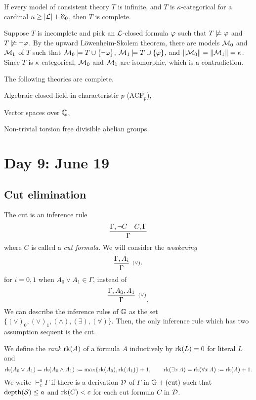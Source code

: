 \documentclass{../../../small}
\begin{document}
\begin{thm*}
If every model of consistent theory $T$ is infinite, and $T$ is $\kappa$-categorical for a cardinal $\kappa\ge|\mathcal{L}|+\aleph_0$, then $T$ is complete.
\end{thm*}
\begin{pf}
Suppose $T$ is incomplete and pick an $\mathcal{L}$-closed formula $\varphi$ such that $T\not\models\varphi$ and $T\not\models\neg\varphi$.
By the upward L\"owenheim-Skolem theorem, there are models $\mathcal{M}_0$ and $\mathcal{M}_1$ of $T$ such that $\mathcal{M}_0\models T\cup\{\neg\varphi\}$, $\mathcal{M}_1\models T\cup\{\varphi\}$, and $\|\mathcal{M}_0\|=\|\mathcal{M}_1\|=\kappa$.
Since $T$ is $\kappa$-categorical, $\mathcal{M}_0$ and $\mathcal{M}_1$ are isomorphic, which is a contradiction.
\end{pf}

\begin{ex*}
The following theories are complete.
\begin{parts}
\item Algebraic closed field in characteristic $p$ (ACF$_p$),
\item Vector spaces over $\mathbb{Q}$,
\item Non-trivial torsion free divisible abelian groups.
\end{parts}
\end{ex*}


\newpage
\section{Day 9: June 19}

\subsection*{Cut elimination}

The cut is an inference rule
\[\infer{\Gamma}{\Gamma,\neg C&C,\Gamma}\]
where $C$ is called a \emph{cut formula}.
We will consider the \emph{weakening}
\[\infer[^{(\vee)_i}]{\Gamma}{\Gamma,A_i}\]
for $i=0,1$ when $A_0\vee A_1\in\Gamma$, instead of
\[\infer[^{(\vee)}]{\Gamma}{\Gamma,A_0,A_1}.\]
We can describe the inference rules of $\mathbb{G}$ as the set $\{(\vee)_0,(\vee)_1,(\wedge),(\exists),(\forall)\}$.
Then, the only inference rule which has two assumption sequent is the cut.

\begin{defn*}
We define the \emph{rank} $\operatorname{rk}(A)$ of a formula $A$ inductively by $\operatorname{rk}(L)=0$ for literal $L$ and
\[\operatorname{rk}(A_0\vee A_1)=\operatorname{rk}(A_0\wedge A_1):=\max\{\operatorname{rk}(A_0),\operatorname{rk}(A_1)\}+1,\qquad\operatorname{rk}(\exists x\,A)=\operatorname{rk}(\forall x\,A):=\operatorname{rk}(A)+1.\]
We write $\vdash_c^a\Gamma$ if there is a derivation $\mathcal{D}$ of $\Gamma$ in $\mathbb{G}+(\text{cut})$ such that $\mathrm{depth}(\mathcal{S})\le a$ and $\operatorname{rk}(C)<c$ for each cut formula $C$ in $\mathcal{D}$.
\end{defn*}
\end{document}
